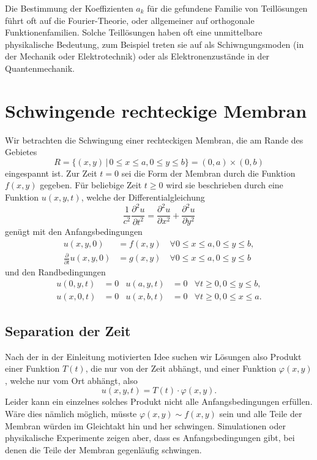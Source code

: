 Die Bestimmung der Koeffizienten $a_k$ für die gefundene Familie
von Teillösungen führt oft auf die Fourier-Theorie, oder allgemeiner
auf orthogonale Funktionenfamilien. Solche Teillösungen haben oft eine
unmittelbare physikalische Bedeutung, zum Beispiel treten sie auf als
Schiwngungsmoden (in der Mechanik oder Elektrotechnik) oder als
Elektronenzustände in der Quantenmechanik.

\section{Schwingende rechteckige Membran}
Wir betrachten die Schwingung einer rechteckigen Membran, die am Rande
des Gebietes
\[
R=\{(x,y)\,|\,0\le x\le a,0\le y\le b\} =(0,a)\times(0,b)
\]
eingespannt ist. Zur Zeit $t=0$ sei die Form der Membran durch die
Funktion $f(x,y)$ gegeben.
Für beliebige Zeit $t\ge 0$ wird sie beschrieben durch eine Funktion $u(x,y,t)$,
welche der Differentialgleichung
\[
\frac1{c^2}\frac{\partial^2u}{\partial t^2}=\frac{\partial^2u}{\partial x^2}+\frac{\partial^2u}{\partial y^2}
\]
genügt mit den Anfangsbedingungen
\begin{align*}
u(x,y,0)&=f(x,y)\quad\forall 0\le x\le a,0\le y\le b,
\\
\frac{\partial}{\partial t}u(x,y,0)&=g(x,y)\quad\forall 0\le x\le a,0\le y\le b
\end{align*}
und den Randbedingungen
\begin{align*}
u(0,y,t)&=0&u(a,y,t)&=0&\forall t\ge 0,0\le y\le b,\\
u(x,0,t)&=0&u(x,b,t)&=0&\forall t\ge 0,0\le x\le a.
\end{align*}

\subsection{Separation der Zeit}
Nach der in der Einleitung motivierten Idee suchen wir Lösungen also
Produkt einer Funktion $T(t)$, die nur von der Zeit abhängt, und einer Funktion
$\varphi(x,y)$, welche nur vom Ort abhängt, also
\[
u(x,y,t)=T(t)\cdot\varphi(x,y).
\]
Leider kann ein einzelnes solches Produkt nicht alle Anfangsbedingungen
erfüllen. Wäre dies nämlich möglich, müsste $\varphi(x,y)\sim f(x,y)$
sein und alle Teile der Membran würden im Gleichtakt hin und her schwingen.
Simulationen oder physikalische Experimente zeigen aber, dass es
Anfangsbedingungen gibt, bei denen die Teile der Membran gegenläufig
schwingen.


